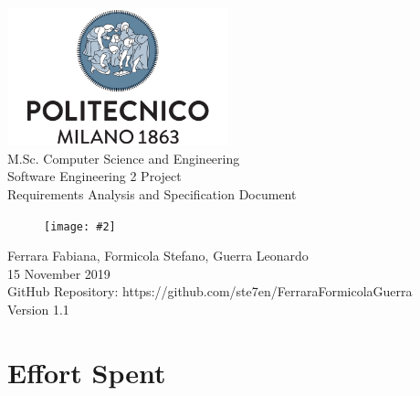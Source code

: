 \documentclass{report}
\newcommand{\image}[4]{
	\begin{figure}[H]
	\centering
	\texttt{[image: \#2]}
	\caption*{#3}
	\label{#4}

	\label{fig:nonfloat} %
	\end{figure}
}
\begin{document}
	\begin{titlepage}
		\centering	
		\vfill
		{
			\includegraphics[width =\linewidth, height = 4cm, keepaspectratio]{PolitecnicoLogo.png}
			\label{fig:PolitecnicoLogo}
			\large \\[2ex]M.Sc. Computer Science and Engineering\\
			\large Software Engineering 2 Project\\[9ex]			
			\huge Requirements Analysis and Specification Document\\[4ex]
			\image{3cm}{Images/Logo.png}{}{Logo}

			\normalsize Ferrara Fabiana, Formicola Stefano, Guerra Leonardo\\[1.5ex]
			\normalsize 15 November 2019 \\[1.5ex]
			\normalsize GitHub Repository: https://github.com/ste7en/FerraraFormicolaGuerra\\[3ex]
			\normalsize Version 1.1


		}
		
	\end{titlepage}


	
	\newpage
	\tableofcontents
	\thispagestyle{fancy}
	
	\newpage
	
	
	
	
	
		
	\chapter{Effort Spent}
	\thispagestyle{fancy}
\end{document}
